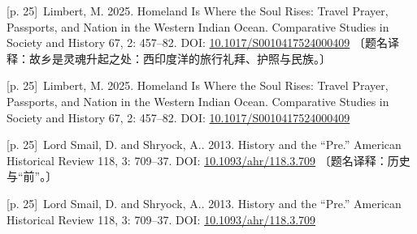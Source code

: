 \documentclass[10pt,a4paper]{article}
\begin{document}
\noindent\begin{minipage}{\textwidth}\begin{minipage}[t]{\dimexpr.5\textwidth-4mm\relax}\noindent\begin{minipage}[t]{\linewidth}{\scriptsize\color{gray} [p. 25]}\ Limbert, M. 2025. Homeland Is Where the Soul Rises: Travel Prayer, Passports, and Nation in the Western Indian Ocean. Comparative Studies in Society and History 67, 2: 457–82. DOI: \url{10.1017/S0010417524000409} 〔题名译释：故乡是灵魂升起之处：西印度洋的旅行礼拜、护照与民族。〕\par\end{minipage}\par\end{minipage}\hfill\begin{minipage}[t]{\dimexpr.5\textwidth-4mm\relax}\noindent\begin{minipage}[t]{\linewidth}{\scriptsize\color{gray} [p. 25]}\ Limbert, M. 2025. Homeland Is Where the Soul Rises: Travel Prayer, Passports, and Nation in the Western Indian Ocean. Comparative Studies in Society and History 67, 2: 457–82. DOI: \url{10.1017/S0010417524000409}\par\end{minipage}\par\end{minipage}\end{minipage}\par
\noindent\begin{minipage}{\textwidth}\begin{minipage}[t]{\dimexpr.5\textwidth-4mm\relax}\noindent\begin{minipage}[t]{\linewidth}{\scriptsize\color{gray} [p. 25]}\ Lord Smail, D. and Shryock, A.. 2013. History and the “Pre.” American Historical Review 118, 3: 709–37. DOI: \url{10.1093/ahr/118.3.709} 〔题名译释：历史与“前”。〕\par\end{minipage}\par\end{minipage}\hfill\begin{minipage}[t]{\dimexpr.5\textwidth-4mm\relax}\noindent\begin{minipage}[t]{\linewidth}{\scriptsize\color{gray} [p. 25]}\ Lord Smail, D. and Shryock, A.. 2013. History and the “Pre.” American Historical Review 118, 3: 709–37. DOI: \url{10.1093/ahr/118.3.709}\par\end{minipage}\par\end{minipage}\end{minipage}\par
\end{document}

